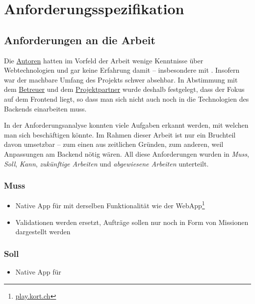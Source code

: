 \chapter{Anforderungsspezifikation}
\label{pd-anforderungsspezifikation}


\section{Anforderungen an die Arbeit} 
Die \hyperref[pm-rollen]{Autoren} hatten im Vorfeld der Arbeit wenige Kenntnisse über Webtechnologien und gar keine Erfahrung damit – insbesondere mit .
Insofern war der machbare Umfang des Projekts schwer absehbar.
In Abstimmung mit dem \hyperref[pm-rollen]{Betreuer} und dem \hyperref[pm-rollen]{Projektpartner} wurde deshalb festgelegt, dass der Fokus auf dem Frontend liegt, so dass man sich nicht auch noch in die Technologien des Backends einarbeiten muss.

In der Anforderungsanalyse konnten viele Aufgaben erkannt werden, mit welchen man sich beschäftigen könnte. Im Rahmen dieser Arbeit ist nur ein Bruchteil davon umsetzbar – zum einen aus zeitlichen Gründen, zum anderen, weil Anpassungen am Backend nötig wären.
All diese Anforderungen wurden in \emph{Muss}, \emph{Soll}, \emph{Kann}, \emph{zukünftige Arbeiten} und \emph{abgewiesene Arbeiten} unterteilt.

\subsection{Muss}
\begin{itemize}
	\item Native App für  mit derselben Funktionalität wie der \gls{WebApp}\footnote{\url{play.kort.ch}}
	\item Validationen werden ersetzt, Aufträge sollen nur noch in Form von Missionen dargestellt werden
\end{itemize}

\subsection{Soll}
\begin{itemize}
	\item Native App für 
\end{itemize}

